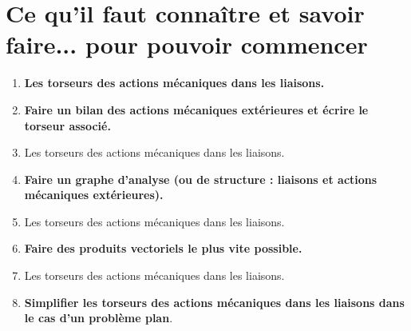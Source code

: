 \def\xxactivite{Cours}
\def\xxauteur{\textsl{Xavier Pessoles}}

\fichetrue
\proftrue
\tdfalse
\coursfalse

\def\xxnumpartie{Rév -- Stat}
\def\xxpartie{Principe fondamental de la statique (PFS)}
\def\xxnumchapitre{ Révisions 2\vspace{.2cm}}
\def\xxchapitre{\hspace{.12cm} Stratégie de résolution}

\def\xxpied{%
Révision statique -- Principe fondamental de la statique\\
Fiche 2 -- \xxactivite%
}


\def\xxcompetences{%
\textsl{%
\textbf{Savoirs et compétences :}\\
}}


\iflivret

\else

\fi
\setlength{\columnseprule}{.1pt}

\vspace{1cm}
\pagestyle{fancy}
\thispagestyle{plain}

\setcounter{section}{0}
\section{Ce qu'il faut connaître et savoir faire... pour pouvoir commencer}
\begin{enumerate}
\item \textbf{Les torseurs des actions mécaniques dans les liaisons.}
\item \textbf{Faire un bilan des actions mécaniques extérieures et écrire le torseur associé.}
\item Les torseurs des actions mécaniques dans les liaisons.
\item \textbf{Faire un graphe d'analyse (ou de structure : liaisons et actions mécaniques extérieures).}
\item Les torseurs des actions mécaniques dans les liaisons.
\item \textbf{Faire des produits vectoriels le plus vite possible.}
\item Les torseurs des actions mécaniques dans les liaisons.
\item \textbf{Simplifier les torseurs des actions mécaniques dans les liaisons dans le cas d'un problème plan}.
\end{enumerate}



